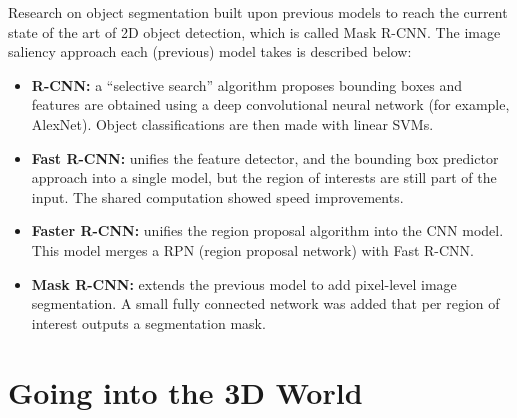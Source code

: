 Research on object segmentation built upon previous models to reach the current state of the art of 2D object detection, which is called Mask R-CNN. The image saliency approach each (previous) model takes is described below:
\begin{itemize}
    \item \textbf{R-CNN:} a “selective search” algorithm proposes bounding boxes and features are obtained using a deep convolutional neural network (for example, AlexNet). Object classifications are then made with linear SVMs.
    \item \textbf{Fast R-CNN:} unifies the feature detector, and the bounding box predictor approach into a single model, but the region of interests are still part of the input. The shared computation showed speed improvements.
    \item \textbf{Faster R-CNN:} unifies the region proposal algorithm into the CNN model. This model merges a RPN (region proposal network) with Fast R-CNN.
    \item \textbf{Mask R-CNN:} extends the previous model to add pixel-level image segmentation. A small fully connected network was added that per region of interest outputs a segmentation mask.
\end{itemize}


\section{Going into the 3D World}\label{chap:2:3d}
\lipsum[2-5]

